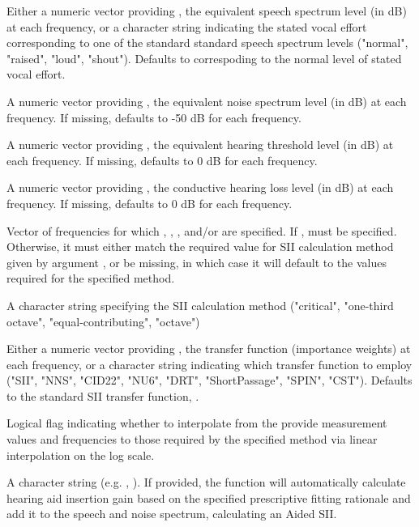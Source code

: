 \documentclass[letterpaper]{book}
\begin{document}
%
\begin{Arguments}
\begin{ldescription}
\item[\code{speech}] Either a numeric vector providing , the
equivalent speech spectrum level (in dB) at each frequency, or a
character string indicating the stated vocal effort corresponding to
one of the standard standard speech spectrum levels ("normal",
"raised", "loud", "shout"). Defaults to 
correspoding to the normal level of stated vocal effort. 
\item[\code{noise}] A numeric vector providing , the
equivalent noise spectrum level (in dB) at each frequency.  If
missing, defaults to -50 dB for each frequency.
\item[\code{threshold}] A numeric vector providing , the
equivalent hearing threshold level (in dB) at each frequency.  If
missing, defaults to 0 dB for each frequency.
\item[\code{loss}] A numeric vector providing , the
conductive hearing loss level (in dB) at each frequency.  If
missing, defaults to 0 dB for each frequency.
\item[\code{freq}] Vector of frequencies for which ,
, , and/or  are specified.
If ,  must be specified.
Otherwise, it must either match the required value for SII
calculation method given by argument , or be missing,
in which case it will default to the values required for the
specified method.
\item[\code{method}] A character string specifying the SII calculation
method ("critical", "one-third octave", "equal-contributing",
"octave")
\item[\code{importance}] Either a numeric vector providing ,
the transfer function (importance weights) at each frequency, or a
character string indicating which transfer function to employ
("SII", "NNS", "CID22", "NU6", "DRT", "ShortPassage", "SPIN",
"CST"). Defaults to the standard SII transfer function,
.
\item[\code{interpolate}] Logical flag indicating whether to interpolate 
from the provide measurement values and frequencies to those 
required by the specified method via linear interpolation on the log
scale.
\item[\code{prescription}] A character string (e.g. , ). If provided, the function will automatically calculate hearing aid insertion gain based on the specified prescriptive fitting rationale and add it to the speech and noise spectrum, calculating an Aided SII.

\end{ldescription}
\end{Arguments}
\end{document}
